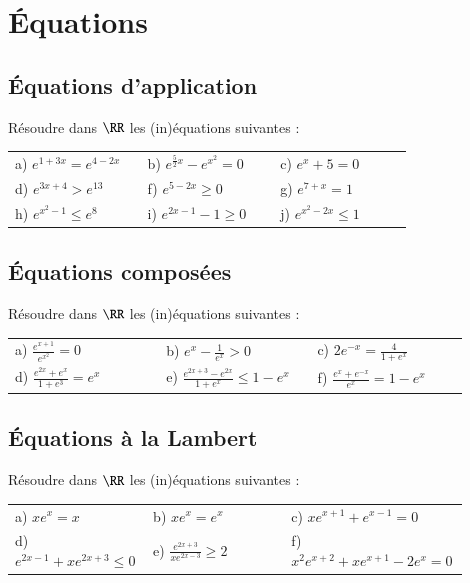 \documentclass[oneside,12pt]{article}          %
\begin{document}
\section{Équations}

\subsection{Équations d'application}
Résoudre dans $\RR$ les (in)équations suivantes :

\renewcommand{\arraystretch}{1.3}
\begin{tabular}{p{0.3\linewidth}p{0.3\linewidth}p{0.3\linewidth}}
    a) $e^{1+3x} = e^{4-2x}$ & b) $e^{\frac{5}{2}x} - e^{x^2} = 0$ & c) $e^x + 5 = 0$ \\
    d) $e^{3x+4} > e^{13}$ & f) $e^{5-2x} \geq 0$ & g) $e^{7+x} = 1$ \\
    h) $e^{x^2-1} \leq e^8$ & i) $e^{2x-1} - 1 \geq 0$ & j) $e^{x^2 - 2x} \leq 1$
\end{tabular}



\subsection{Équations composées}
Résoudre dans $\RR$ les (in)équations suivantes :

\renewcommand{\arraystretch}{1.5}
\begin{tabular}{p{0.3\linewidth}p{0.3\linewidth}p{0.3\linewidth}}
    a) $\frac{e^{x+1}}{e^{x^2}} = 0$ & b) $e^x-\frac{1}{e^x} > 0$ & c) $2e^{-x}=\frac{4}{1 + e^x}$\\
    d) $\frac{e^{2x} + e^x}{1 + e^3} = e^x$ & e) $\frac{e^{2x+3} - e^{2x}}{1 + e^x} \leq 1 - e^x$ & f) $\frac{e^x + e^{-x}}{e^x} = 1 - e^x$ \\
\end{tabular}



\subsection{Équations à la Lambert}
Résoudre dans $\RR$ les (in)équations suivantes :

\renewcommand{\arraystretch}{1.3}
\begin{tabular}{p{0.3\linewidth}p{0.3\linewidth}p{0.3\linewidth}}
    a) $x e^x = x$ & b)  $x e^x = e^x$ & c)  $x e^{x+1} + e^{x-1} = 0$\\
    d) $e^{2x-1} + x e^{2x+3} \leq 0$ & e) $\frac{e^{2x+3}}{x e^{2x-3}} \geq 2$ & f) $x^2 e^{x+2} + x e^{x+1} - 2e^x = 0$\\
\end{tabular}
\end{document}
